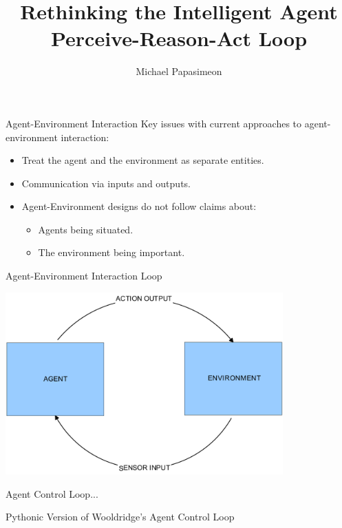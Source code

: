 \documentclass[xcolor=dvipsnames,t]{beamer}
\title[Intelligent Agents]{Rethinking the Intelligent Agent \\ Perceive-Reason-Act Loop}
\author{Michael Papasimeon}
\date{}
\newcommand{\showcode}[1]{\begin{mdframed}[style=code] %
                          \end{mdframed}%
}
\begin{document}
\begin{frame}
    \maketitle
\end{frame} 

\begin{frame}{Agent-Environment Interaction} 
    Key issues with current approaches to agent-environment interaction:
    \begin{itemize}
        \item Treat the agent and the environment as separate entities.
        \item Communication via inputs and outputs.
        \item Agent-Environment designs do not follow claims about:
            \begin{itemize}
                \item Agents being situated.
                \item The environment being important. 
            \end{itemize} 
    \end{itemize} 
\end{frame} 

\begin{frame}{Agent-Environment Interaction Loop} 
    \begin{center}
        \includegraphics[width=0.8\textwidth]{loop} 
    \end{center} 
\end{frame} 

\begin{frame}{Agent Control Loop...}
    \begin{block}{Pythonic Version of Wooldridge's Agent Control Loop} 
        \showcode{wooldridge.py} 
    \end{block} 
\end{frame} 
\end{document}
